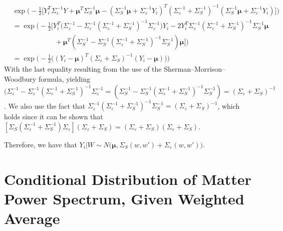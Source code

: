 \documentclass[11pt]{article}
\begin{document}
$$
\begin{aligned}
&\exp\Big(-\frac{1}{2}\big[Y_i^T\Sigma_\varepsilon^{-1} Y + 
\boldsymbol{\mu}^T\Sigma_S^{-1} \boldsymbol{\mu} - (\Sigma_S^{-1} \boldsymbol{\mu} + 
\Sigma_\varepsilon^{-1} Y_i)^T(\Sigma_\varepsilon^{-1}+\Sigma_S^{-1})^{-1} 
(\Sigma_S^{-1} \boldsymbol{\mu} + \Sigma_\varepsilon^{-1} Y_i)\big]\Big) \\
&= \exp\Big(-\frac{1}{2}\big[Y_i^T\big(\Sigma_\varepsilon^{-1} - 
\Sigma_\varepsilon^{-1}(\Sigma_\varepsilon^{-1}+\Sigma_S^{-1})^{-1}\Sigma_\varepsilon^{-1}\big)Y_i 
-2Y_i^T \Sigma_\varepsilon^{-1}(\Sigma_\varepsilon^{-1}+\Sigma_S^{-1})^{-1}\Sigma_S^{-1} \boldsymbol{\mu} \\
&\qquad \qquad \qquad + \boldsymbol{\mu}^T (\Sigma_S^{-1} - \Sigma_S^{-1}(\Sigma_\varepsilon^{-1}
+\Sigma_S^{-1})^{-1}\Sigma_S^{-1}) \boldsymbol{\mu}\big]\Big) \\
&= \exp\Big(-\frac{1}{2}\big((Y_i-\boldsymbol{\mu})^T(\Sigma_\varepsilon+\Sigma_S)^{-1}
(Y_i-\boldsymbol{\mu}) \big)\Big)
\end{aligned}
$$
With the last equality resulting from the use of the Sherman–Morrison–Woodbury formula, 
yielding $\big(\Sigma_\varepsilon^{-1} - \Sigma_\varepsilon^{-1}(\Sigma_\varepsilon^{-1}+
\Sigma_S^{-1})^{-1}\Sigma_\varepsilon^{-1} = (\Sigma_S^{-1} - \Sigma_S^{-1}
(\Sigma_\varepsilon^{-1}+\Sigma_S^{-1})^{-1}\Sigma_S^{-1}) = (\Sigma_\varepsilon+\Sigma_S)^{-1}$. 
We also use the fact that $\Sigma_\varepsilon^{-1}(\Sigma_\varepsilon^{-1}+
\Sigma_S^{-1})^{-1}\Sigma_S^{-1} = (\Sigma_\varepsilon + \Sigma_S)^{-1}$, 
which holds since it can be shown that 
$[\Sigma_S(\Sigma_\varepsilon^{-1}+\Sigma_S^{-1})\Sigma_\varepsilon](\Sigma_\varepsilon+\Sigma_S)
=(\Sigma_\varepsilon+\Sigma_S)(\Sigma_\varepsilon+\Sigma_S)$.

Therefore, we have that $Y_i|W \sim N\big(\boldsymbol{\mu}, \Sigma_S(w,w')+\Sigma_\varepsilon(w,w')\big)$.

\section{Conditional Distribution of Matter Power Spectrum, Given Weighted Average}
\label{sec:apdx_SgivenY}
\end{document}
